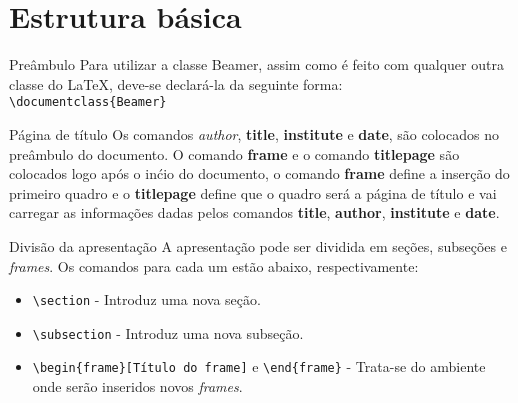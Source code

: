 \documentclass{beamer}
\begin{document}
\section{Estrutura b\'asica}

\begin{frame}[fragile]
   \begin{block}{Pre\^ambulo}
        Para utilizar a classe Beamer, assim como é feito com qualquer outra classe do \LaTeX, deve-se declará-la da seguinte forma: \\
    \vspace{0.5cm}
    \verb|\documentclass{Beamer}|   
   \end{block}
    \pause
   \begin{block}{P\'agina de t\'itulo}
       \justifying Os comandos \textit{author}, \textbf{title}, \textbf{institute} e \textbf{date}, são colocados no pre\^ambulo do documento. O comando \textbf{frame} e o comando \textbf{titlepage} são colocados logo ap\'os o in\'cio do documento, o comando \textbf{frame} define a inserção do primeiro quadro e o \textbf{titlepage} define que o quadro será a página de título e vai carregar as informações dadas pelos comandos \textbf{title}, \textbf{author}, \textbf{institute} e \textbf{date}.     
   \end{block}
\end{frame}

\begin{frame}[fragile]
   \begin{block}{Divis\~ao da apresenta\c c\~ao}
    A apresentação pode ser dividida em seções, subseções e \textit{frames}. Os comandos para cada um estão abaixo, respectivamente:
       
        \begin{itemize}
            \item <1-> \verb|\section| - Introduz uma nova se\c c\~ao.

            \item <2-> \verb|\subsection| - Introduz uma nova subse\c c\~ao.

            \item <3-> \verb|\begin{frame}[Título do frame]| e \verb|\end{frame}| - Trata-se do ambiente onde ser\~ao inseridos novos \textit{frames}.
       \end{itemize}
       
    \end{block} 
\end{frame}
\end{document}

